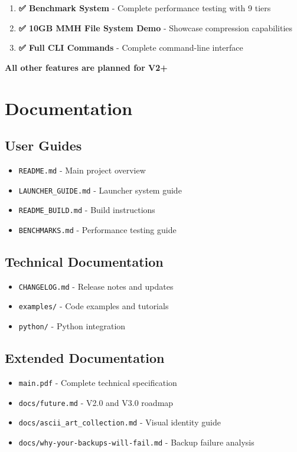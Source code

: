 \documentclass[11pt,a4paper]{article}
\begin{document}
	\begin{enumerate}
		\item \textbf{✅ Benchmark System} - Complete performance testing with 9 tiers
		\item \textbf{✅ 10GB MMH File System Demo} - Showcase compression capabilities
		\item \textbf{✅ Full CLI Commands} - Complete command-line interface
	\end{enumerate}

	\textbf{All other features are planned for V2+}

	\section{Documentation}
	\label{sec:documentation}

	\subsection{User Guides}
	\begin{itemize}
		\item \texttt{README.md} - Main project overview
		\item \texttt{LAUNCHER\_GUIDE.md} - Launcher system guide
		\item \texttt{README\_BUILD.md} - Build instructions
		\item \texttt{BENCHMARKS.md} - Performance testing guide
	\end{itemize}

	\subsection{Technical Documentation}
	\begin{itemize}
		\item \texttt{CHANGELOG.md} - Release notes and updates
		\item \texttt{examples/} - Code examples and tutorials
		\item \texttt{python/} - Python integration
	\end{itemize}

	\subsection{Extended Documentation}
	\begin{itemize}
		\item \texttt{main.pdf} - Complete technical specification
		\item \texttt{docs/future.md} - V2.0 and V3.0 roadmap
		\item \texttt{docs/ascii\_art\_collection.md} - Visual identity guide
		\item \texttt{docs/why-your-backups-will-fail.md} - Backup failure analysis
	\end{itemize}
\end{document}

